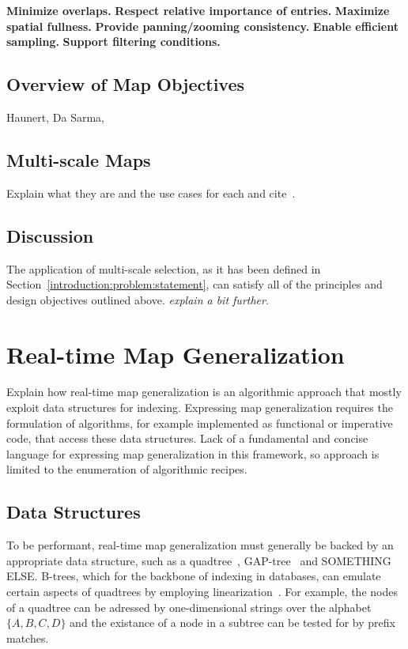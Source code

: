 \documentclass[11pt, oneside]{report}
\newcommand{\minisec}[1]{\noindent\textbf{#1.}}
\begin{document}
\minisec{Minimize overlaps}
\minisec{Respect relative importance of entries}
\minisec{Maximize spatial fullness}
\minisec{Provide panning/zooming consistency}
\minisec{Enable efficient sampling}
\minisec{Support filtering conditions}

\subsection{Overview of Map Objectives}

Haunert, Da Sarma, 

\subsection{Multi-scale Maps}

Explain what they are and the use cases for each and cite~\cite{foerster2010challenges,sarma2012fusiontables}.


\subsection{Discussion}

The application of multi-scale selection, as it has been defined in Section~\ref{introduction:problem:statement}, can satisfy all of the principles and design objectives outlined above. \emph{explain a bit further}.


\section{Real-time Map Generalization}

Explain how real-time map generalization is an algorithmic approach that mostly exploit data structures for indexing. Expressing map generalization requires the formulation of algorithms, for example implemented as functional or imperative code, that access these data structures. Lack of a fundamental and concise language for expressing map generalization in this framework, so approach is limited to the enumeration of algorithmic recipes.

\subsection{Data Structures}
To be performant, real-time map generalization must generally be backed by an appropriate data structure, such as a quadtree~\cite{bereuter2013real}, GAP-tree~\cite{van1995gap} and SOMETHING ELSE. B-trees, which for the backbone of indexing in databases, can emulate certain aspects of quadtrees by employing linearization~\cite{zcurve, hilbertcurve}. For example, the nodes of a quadtree can be adressed by one-dimensional strings over the alphabet $\lbrace A, B, C, D \rbrace$ and the existance of a node in a subtree can be tested for by prefix matches.
\end{document}
